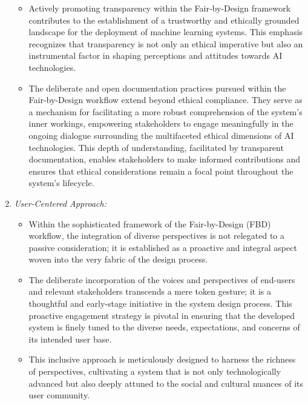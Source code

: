 \begin{enumerate}[label=\arabic*.]
\begin{itemize}
        \item Actively promoting transparency within the Fair-by-Design framework contributes to the establishment of a trustworthy and ethically grounded landscape for the deployment of machine learning systems. This emphasis recognizes that transparency is not only an ethical imperative but also an instrumental factor in shaping perceptions and attitudes towards AI technologies.
    
        \item The deliberate and open documentation practices pursued within the Fair-by-Design workflow extend beyond ethical compliance. They serve as a mechanism for facilitating a more robust comprehension of the system's inner workings, empowering stakeholders to engage meaningfully in the ongoing dialogue surrounding the multifaceted ethical dimensions of AI technologies. This depth of understanding, facilitated by transparent documentation, enables stakeholders to make informed contributions and ensures that ethical considerations remain a focal point throughout the system's lifecycle.
    
    \end{itemize}

    \item \emph{User-Centered Approach:}
   
    \begin{itemize}
      
        \item Within the sophisticated framework of the Fair-by-Design (FBD) workflow, the integration of diverse perspectives is not relegated to a passive consideration; it is established as a proactive and integral aspect woven into the very fabric of the design process.
    
        \item The deliberate incorporation of the voices and perspectives of end-users and relevant stakeholders transcends a mere token gesture; it is a thoughtful and early-stage initiative in the system design process. This proactive engagement strategy is pivotal in ensuring that the developed system is finely tuned to the diverse needs, expectations, and concerns of its intended user base.
    
        \item This inclusive approach is meticulously designed to harness the richness of perspectives, cultivating a system that is not only technologically advanced but also deeply attuned to the social and cultural nuances of its user community.
    

\end{itemize}
\end{enumerate}
